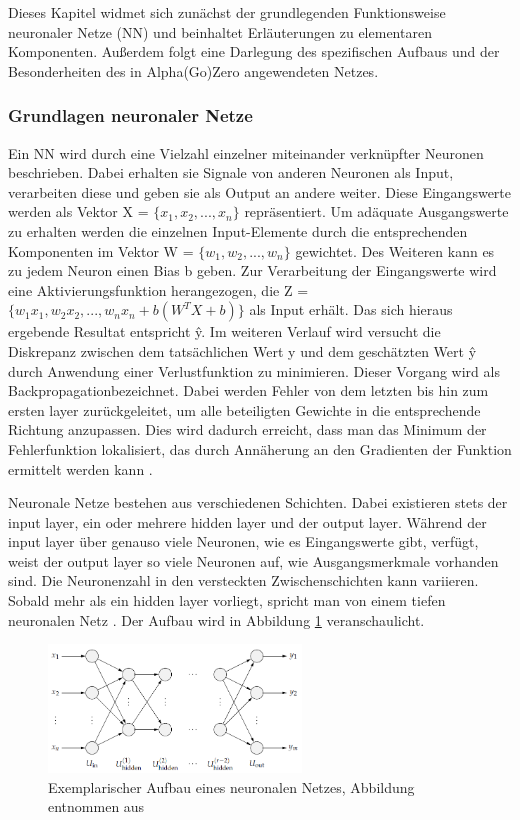 \documentclass[12pt,a4paper]{article}
\begin{document}
Dieses Kapitel widmet sich zunächst der grundlegenden Funktionsweise neuronaler Netze (NN) und beinhaltet Erläuterungen zu elementaren Komponenten. Außerdem folgt eine Darlegung des spezifischen Aufbaus und der Besonderheiten des in Alpha(Go)Zero angewendeten Netzes.

\subsubsection{Grundlagen neuronaler Netze}
Ein NN wird durch eine Vielzahl einzelner miteinander verknüpfter Neuronen beschrieben. Dabei erhalten sie Signale von anderen Neuronen als Input, verarbeiten diese und geben sie als Output an andere weiter. Diese Eingangswerte werden als Vektor X = $\{x_{1}, x_{2}, ..., x_{n}\}$ repräsentiert. Um adäquate Ausgangswerte zu erhalten werden die einzelnen Input-Elemente durch die entsprechenden Komponenten im Vektor W = $\{w_{1}, w_{2}, ..., w_{n}\}$ gewichtet. Des Weiteren kann es zu jedem Neuron einen Bias b geben. Zur Verarbeitung der Eingangswerte wird eine Aktivierungsfunktion herangezogen, die Z = $\{w_{1}x_{1}, w_{2}x_{2}, ..., w_{n}x_{n} + b(W^{T}X + b)\}$ als Input erhält. Das sich hieraus ergebende Resultat entspricht \^{y}. Im weiteren Verlauf wird versucht die Diskrepanz zwischen dem tatsächlichen Wert y und dem geschätzten Wert \^{y} durch Anwendung einer Verlustfunktion zu minimieren. Dieser Vorgang wird als \glqq{}Backpropagation\grqq bezeichnet. Dabei werden Fehler von dem letzten bis hin zum ersten layer zurückgeleitet, um alle beteiligten Gewichte in die entsprechende Richtung anzupassen. Dies wird dadurch erreicht, dass man das Minimum der Fehlerfunktion lokalisiert, das durch Annäherung an den Gradienten der Funktion ermittelt werden kann \cite[S. 75-79]{Sewak2019}. 

Neuronale Netze bestehen aus verschiedenen Schichten. Dabei existieren stets der input layer, ein oder mehrere hidden layer und der output layer. Während der input layer über genauso viele Neuronen, wie es Eingangswerte gibt, verfügt, weist der output layer so viele Neuronen auf, wie Ausgangsmerkmale vorhanden sind. Die Neuronenzahl in den versteckten Zwischenschichten kann variieren. Sobald mehr als ein hidden layer vorliegt, spricht man von einem tiefen neuronalen Netz \cite[S. 77]{Sewak2019}. Der Aufbau wird in Abbildung \ref{fig:aufbau_nn} veranschaulicht.

\begin{figure}
\centering
\includegraphics[width=0.6\textwidth]{pics/Aufbau_NN.png}	
\caption{Exemplarischer Aufbau eines neuronalen Netzes, Abbildung entnommen aus \cite[S. 44]{Kruse2015}}
\label{fig:aufbau_nn}
\end{figure}
\end{document}
